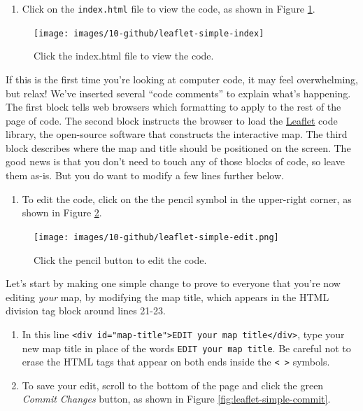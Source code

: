 \documentclass[
  english,
]{book}
\providecommand{\tightlist}{%
  \setlength{\itemsep}{0pt}\setlength{\parskip}{0pt}}
\begin{document}
\begin{enumerate}
\def\labelenumi{\arabic{enumi}.}
\setcounter{enumi}{4}
\tightlist
\item
  Click on the \texttt{index.html} file to view the code, as shown in Figure \ref{fig:leaflet-simple-index}.
\end{enumerate}



\begin{figure}
\texttt{[image: images/10-github/leaflet-simple-index]} \caption{Click the index.html file to view the code.}\label{fig:leaflet-simple-index}
\end{figure}

If this is the first time you're looking at computer code, it may feel overwhelming, but relax! We've inserted several ``code comments'' to explain what's happening. The first block tells web browsers which formatting to apply to the rest of the page of code. The second block instructs the browser to load the \href{https://leafletjs.com}{Leaflet} code library, the open-source software that constructs the interactive map. The third block describes where the map and title should be positioned on the screen. The good news is that you don't need to touch any of those blocks of code, so leave them as-is. But you do want to modify a few lines further below.

\begin{enumerate}
\def\labelenumi{\arabic{enumi}.}
\setcounter{enumi}{5}
\tightlist
\item
  To edit the code, click on the the pencil symbol in the upper-right corner, as shown in Figure \ref{fig:leaflet-simple-edit}.
\end{enumerate}



\begin{figure}
\centering
\texttt{[image: images/10-github/leaflet-simple-edit.png]}
\caption{\label{fig:leaflet-simple-edit}Click the pencil button to edit the code.}
\end{figure}

Let's start by making one simple change to prove to everyone that you're now editing \emph{your} map, by modifying the map title, which appears in the HTML division tag block around lines 21-23.

\begin{enumerate}
\def\labelenumi{\arabic{enumi}.}
\setcounter{enumi}{6}
\item
  In this line \texttt{\textless{}div\ id="map-title"\textgreater{}EDIT\ your\ map\ title\textless{}/div\textgreater{}}, type your new map title in place of the words \texttt{EDIT\ your\ map\ title}. Be careful not to erase the HTML tags that appear on both ends inside the \texttt{\textless{}\ \textgreater{}} symbols.
\item
  To save your edit, scroll to the bottom of the page and click the green \emph{Commit Changes} button, as shown in Figure \ref{fig:leaflet-simple-commit}.
\end{enumerate}
\end{document}
